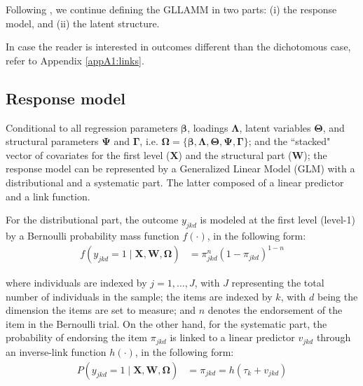 Following \citet{Rabe_et_al_2004a, Rabe_et_al_2004b}, we continue defining the GLLAMM in two parts: (i) the response model, and (ii) the latent structure.

In case the reader is interested in outcomes different than the dichotomous case, refer to Appendix \ref{appA1:links}.


\subsection{Response model} \label{s_sect:response}

Conditional to all regression parameters $\pmb{\beta}$, loadings $\pmb{\Lambda}$, latent variables $\pmb{\Theta}$, and structural parameters $\pmb{\Psi}$ and $\pmb{\Gamma}$, i.e. $\pmb{\Omega} = \{ \pmb{\beta}, \pmb{\Lambda}, \pmb{\Theta}, \pmb{\Psi}, \pmb{\Gamma} \}$; and the ``stacked" vector of covariates for the first level ($\mathbf{X}$) and the structural part ($\mathbf{W}$); the response model can be represented by a Generalized Linear Model (GLM) \cite{Nelder_et_al_1972, Nelder_et_al_1989} with a distributional and a systematic part. The latter composed of a linear predictor and a link function.

For the distributional part, the outcome $y_{jkd}$ is modeled at the first level (level-1) by a Bernoulli probability mass function $f(\cdot)$, in the following form:
%
\begin{equation} \label{eq:distributional}
	\begin{split}
		f \left( y_{jkd}=1 \; | \; \mathbf{X}, \mathbf{W}, \pmb{\Omega} \right) &= \pi_{jkd}^{n} (1 - \pi_{jkd})^{1-n}
	\end{split}
\end{equation}

\noindent where individuals are indexed by $j = 1, \dots, J$, with $J$ representing the total number of individuals in the sample; the items are indexed by $k$, with $d$ being the dimension the items are set to measure; and $n$ denotes the endorsement of the item in the Bernoulli trial. On the other hand, for the systematic part, the probability of endorsing the item $\pi_{jkd}$ is linked to a linear predictor $v_{jkd}$ through an inverse-link function $h(\cdot)$, in the following form:
%
\begin{equation} \label{eq:systematic}
	\begin{split}
		P\left( y_{jkd}=1 \; | \; \mathbf{X}, \mathbf{W}, \pmb{\Omega} \right) &= \pi_{jkd} = h( \tau_{k} + v_{jkd} )
	\end{split}	
\end{equation}

